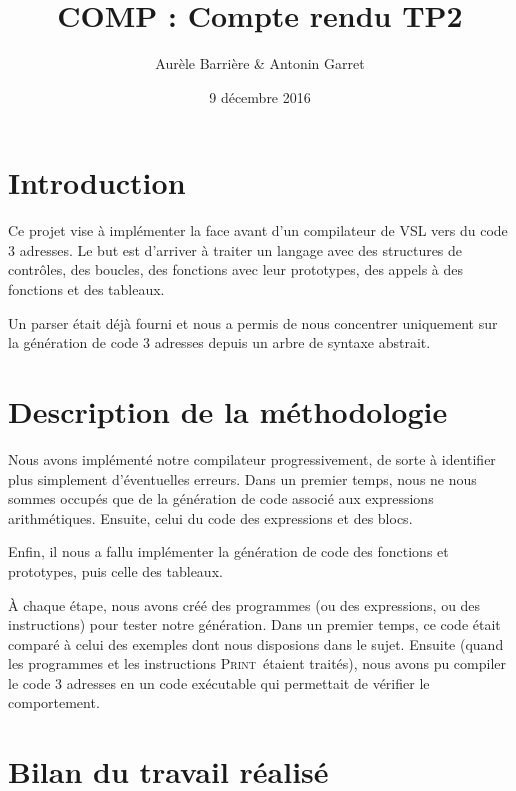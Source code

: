 \documentclass[french]{article}
\title{COMP : Compte rendu TP2}
\author{Aurèle Barrière \& Antonin Garret}
\date{9 décembre 2016}
\begin{document}
\maketitle

\def\iprint{\textsc{Print}}
\def\iread{\textsc{Read}}
\def\return{\textsc{Return}}

\section{Introduction}
Ce projet vise à implémenter la face avant d'un compilateur de VSL  vers du code 3 adresses.
Le but est d'arriver à traiter un langage avec des structures de contrôles, des boucles, des fonctions avec leur prototypes, des appels à des fonctions et des tableaux.

Un parser était déjà fourni et nous a permis de nous concentrer uniquement sur la génération de code 3 adresses depuis un arbre de syntaxe abstrait.


\section{Description de la méthodologie}
Nous avons implémenté notre compilateur progressivement, de sorte à identifier plus simplement d'éventuelles erreurs. Dans un premier temps, nous ne nous sommes occupés que de la génération de code associé aux expressions arithmétiques. Ensuite, celui du code des expressions et des blocs.

Enfin, il nous a fallu implémenter la génération de code des fonctions et prototypes, puis celle des tableaux.

À chaque étape, nous avons créé des programmes (ou des expressions, ou des instructions) pour tester notre génération. Dans un premier temps, ce code était comparé à celui des exemples dont nous disposions dans le sujet. Ensuite (quand les programmes et les instructions \iprint\ étaient traités), nous avons pu compiler le code 3 adresses en un code exécutable qui permettait de vérifier le comportement.


\section{Bilan du travail réalisé}
\end{document}
